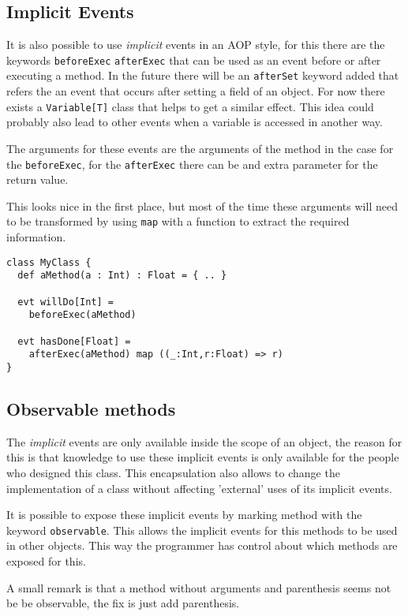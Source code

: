 \documentclass{article}
\begin{document}
\subsection{Implicit Events}
It is also possible to use \emph{implicit} events in an AOP style, for this
there are the keywords {\tt beforeExec} {\tt afterExec} that can be used 
as an event before or after executing a method. In the future there will
be an {\tt afterSet} keyword added that refers the an event that occurs
after setting a field of an object. For now there exists a {\tt Variable[T]}
class that helps to get a similar effect. This idea could probably also lead 
to other events when a variable is accessed in another way.

The arguments for these events are the arguments of the method in the 
case for the {\tt beforeExec}, for the {\tt afterExec} there can be and extra 
parameter for the return value. 

This looks nice in the first place, but most of the time these arguments
will need to be transformed by using {\tt map} with a function to extract
the required information. 

\begin{lstlisting}
class MyClass {
  def aMethod(a : Int) : Float = { .. }

  evt willDo[Int] = 
    beforeExec(aMethod)

  evt hasDone[Float] = 
    afterExec(aMethod) map ((_:Int,r:Float) => r)
}
\end{lstlisting}

\subsection{Observable methods}
The \emph{implicit} events are only available inside the scope of an object,
the reason for this is that knowledge to use these implicit events
is only available for the people who designed this class. This
encapsulation also allows to change the implementation of a class
without affecting 'external' uses of its implicit events.

It is possible to expose these implicit events by marking method with 
the keyword {\tt observable}.  This allows the implicit events for this
methods to be used in other objects. This way the programmer has
control about which methods are exposed for this.

A small remark is that a method without arguments and parenthesis 
seems not be be observable, the fix is just add parenthesis.
\end{document}
